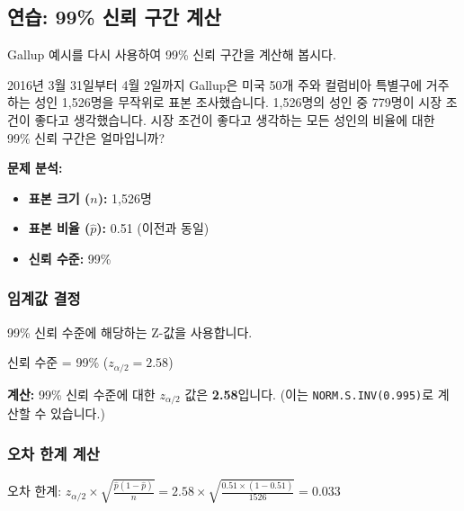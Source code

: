 \documentclass[11pt,a4paper]{book}
\newcommand{\excel}[1]{\texttt{#1}}
\theoremstyle{definition}
\begin{document}
\subsection{연습: 99\% 신뢰 구간 계산}

Gallup 예시를 다시 사용하여 99\% 신뢰 구간을 계산해 봅시다.

\begin{tcolorbox}[title={슬라이드 77: 연습}]
2016년 3월 31일부터 4월 2일까지 Gallup은 미국 50개 주와 컬럼비아 특별구에 거주하는 성인 1,526명을 무작위로 표본 조사했습니다. 1,526명의 성인 중 779명이 시장 조건이 좋다고 생각했습니다.
시장 조건이 좋다고 생각하는 모든 성인의 비율에 대한 99\% 신뢰 구간은 얼마입니까?
\end{tcolorbox}

\textbf{문제 분석:}
\begin{itemize}
    \item \textbf{표본 크기 ($n$):} 1,526명
    \item \textbf{표본 비율 ($\hat{p}$):} 0.51 (이전과 동일)
    \item \textbf{신뢰 수준:} 99\%
\end{itemize}

\subsubsection{임계값 결정}

99\% 신뢰 수준에 해당하는 Z-값을 사용합니다.

\begin{tcolorbox}[title={슬라이드 78: 연습 - 풀이}]
신뢰 수준 = 99\% ($z_{\alpha/2} = 2.58$)
\end{tcolorbox}

\textbf{계산:}
99\% 신뢰 수준에 대한 $z_{\alpha/2}$ 값은 \textbf{2.58}입니다. (이는 \excel{NORM.S.INV(0.995)}로 계산할 수 있습니다.)

\subsubsection{오차 한계 계산}

\begin{tcolorbox}[title={슬라이드 78: 연습 - 풀이}]
오차 한계: $z_{\alpha/2} \times \sqrt{\frac{\hat{p}(1-\hat{p})}{n}} = 2.58 \times \sqrt{\frac{0.51 \times (1-0.51)}{1526}} = 0.033$
\end{tcolorbox}
\end{document}

